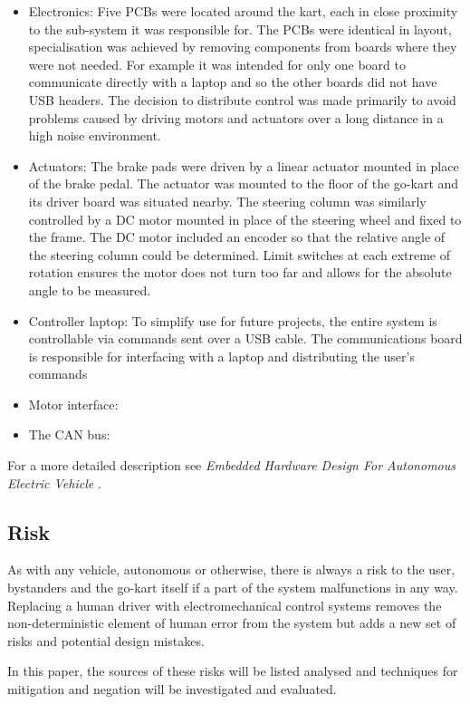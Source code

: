 \begin{itemize}
 \item Electronics: Five PCBs were located around the kart, each in close proximity to 
 the sub-system it was responsible for. The PCBs were identical in layout, specialisation was
 achieved by removing components from boards where they were not needed. For example
 it was intended for only one board to communicate directly with a laptop and so the other
 boards did not have USB headers. The decision to distribute control was made primarily to avoid
 problems caused by driving motors and actuators over a long distance in a high noise environment.
 \item Actuators: The brake pads were driven by a linear actuator mounted in place of the brake pedal. 
 The actuator was mounted to the floor of the go-kart and its driver board was situated nearby. The 
 steering column was similarly controlled by a DC motor mounted in place of the steering wheel 
 and fixed to the frame. The DC motor included an encoder so that the relative angle of the 
 steering column could be determined. Limit switches at each extreme of rotation ensures the
 motor does not turn too far and allows for the absolute angle to be measured.
 \item Controller laptop: To simplify use for future projects, the entire system is controllable via
 commands sent over a USB cable. The communications board is responsible for interfacing with
 a laptop and distributing the user's commands 
 \item Motor interface:


 \item The CAN bus:
\end{itemize}

For a more detailed description see \emph{Embedded Hardware Design For Autonomous Electric
Vehicle} \cite{jenkins_2011}.

\subsection{Risk}
As with any vehicle, autonomous or otherwise, there is always a risk to the user, bystanders and
 the go-kart itself if a part of the system malfunctions in any way. Replacing a human driver with 
 electromechanical control systems removes the non-deterministic element of human error 
 from the system but adds a new set of risks and potential design mistakes.
 
 In this paper, the sources of these risks will be listed analysed and techniques for mitigation and
 negation will be investigated and evaluated.


